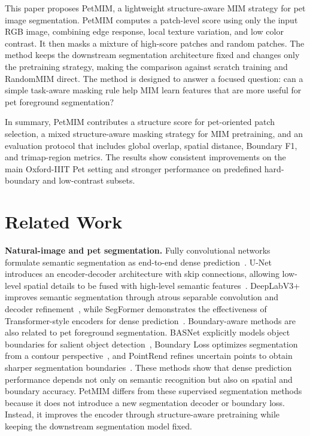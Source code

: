 \documentclass[11pt]{article}
\begin{document}
This paper proposes PetMIM, a lightweight structure-aware MIM strategy for pet image segmentation. PetMIM computes a patch-level score using only the input RGB image, combining edge response, local texture variation, and low color contrast. It then masks a mixture of high-score patches and random patches. The method keeps the downstream segmentation architecture fixed and changes only the pretraining strategy, making the comparison against scratch training and RandomMIM direct. The method is designed to answer a focused question: can a simple task-aware masking rule help MIM learn features that are more useful for pet foreground segmentation?

In summary, PetMIM contributes a structure score for pet-oriented patch selection, a mixed structure-aware masking strategy for MIM pretraining, and an evaluation protocol that includes global overlap, spatial distance, Boundary F1, and trimap-region metrics. The results show consistent improvements on the main Oxford-IIIT Pet setting and stronger performance on predefined hard-boundary and low-contrast subsets.

\section{Related Work}

\textbf{Natural-image and pet segmentation.} Fully convolutional networks formulate semantic segmentation as end-to-end dense prediction~\cite{long2015fully}. U-Net introduces an encoder-decoder architecture with skip connections, allowing low-level spatial details to be fused with high-level semantic features~\cite{ronneberger2015unet}. DeepLabV3+ improves semantic segmentation through atrous separable convolution and decoder refinement~\cite{chen2018encoder}, while SegFormer demonstrates the effectiveness of Transformer-style encoders for dense prediction~\cite{xie2021segformer}. Boundary-aware methods are also related to pet foreground segmentation. BASNet explicitly models object boundaries for salient object detection~\cite{qin2019basnet}, Boundary Loss optimizes segmentation from a contour perspective~\cite{kervadec2019boundary}, and PointRend refines uncertain points to obtain sharper segmentation boundaries~\cite{kirillov2020pointrend}. These methods show that dense prediction performance depends not only on semantic recognition but also on spatial and boundary accuracy. PetMIM differs from these supervised segmentation methods because it does not introduce a new segmentation decoder or boundary loss. Instead, it improves the encoder through structure-aware pretraining while keeping the downstream segmentation model fixed.
\end{document}
